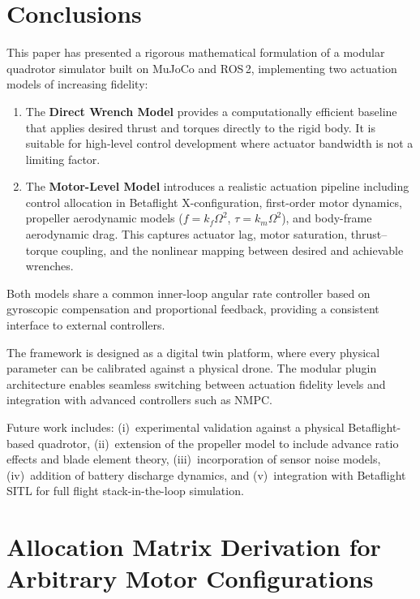 \documentclass[journal]{IEEEtran}
\begin{document}
\section{Conclusions}
\label{sec:conclusions}

This paper has presented a rigorous mathematical formulation of a modular quadrotor simulator built on MuJoCo and ROS\,2, implementing two actuation models of increasing fidelity:

\begin{enumerate}
  \item The \textbf{Direct Wrench Model} provides a computationally efficient baseline that applies desired thrust and torques directly to the rigid body. It is suitable for high-level control development where actuator bandwidth is not a limiting factor.

  \item The \textbf{Motor-Level Model} introduces a realistic actuation pipeline including control allocation in Betaflight X-configuration, first-order motor dynamics, propeller aerodynamic models ($f = k_f\Omega^2$, $\tau = k_m\Omega^2$), and body-frame aerodynamic drag. This captures actuator lag, motor saturation, thrust--torque coupling, and the nonlinear mapping between desired and achievable wrenches.
\end{enumerate}

Both models share a common inner-loop angular rate controller based on gyroscopic compensation and proportional feedback, providing a consistent interface to external controllers.

The framework is designed as a digital twin platform, where every physical parameter can be calibrated against a physical drone. The modular plugin architecture enables seamless switching between actuation fidelity levels and integration with advanced controllers such as NMPC.

Future work includes: (i)~experimental validation against a physical Betaflight-based quadrotor, (ii)~extension of the propeller model to include advance ratio effects and blade element theory, (iii)~incorporation of sensor noise models, (iv)~addition of battery discharge dynamics, and (v)~integration with Betaflight SITL for full flight stack-in-the-loop simulation.


\appendices

\section{Allocation Matrix Derivation for Arbitrary Motor Configurations}
\label{app:allocation}
\end{document}
